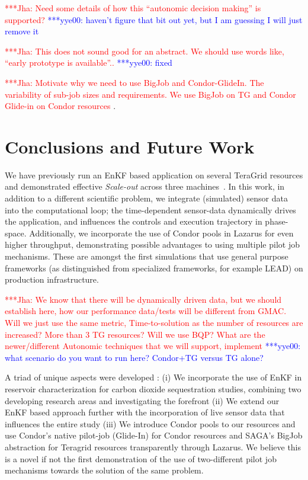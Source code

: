 \documentclass[10pt,conference,final]{IEEEtran}
\newcommand{\jhanote}[1]{ {\textcolor{red} { ***Jha: #1 }}}
\newcommand{\yyenote}[1]{ {\textcolor{blue} { ***yye00: #1 }}}
\newcommand{\jhanote}[1]{}
\newcommand{\yyenote}[1]{}
\begin{document}
\jhanote{Need some details of how this ``autonomic decision making'' is supported?}
\yyenote{haven't figure that bit out yet, but I am guessing I will just remove it}

\jhanote{This does not sound good for an abstract. We should use words like, ``early 
prototype is available''..}
\yyenote{fixed}

\jhanote{Motivate why we need to use BigJob and Condor-GlideIn. The variability of
sub-job sizes and requirements. We use BigJob on TG and Condor Glide-in on Condor
resources}.

\section*{Conclusions and Future Work}

We have previously run an EnKF based application on several 
TeraGrid resources and demonstrated effective {\it Scale-out} across three 
machines~\cite{gmac}. In this work, in addition to a different scientific problem, we 
integrate (simulated) sensor data into the computational loop; the time-dependent 
sensor-data dynamically drives the application, and influences the controls and execution 
trajectory in phase-space. Additionally, we incorporate the use of Condor pools
in Lazarus for even higher throughput, demonstrating possible advantages to
using multiple pilot job mechanisms. These are amongst the first simulations that use general 
purpose frameworks (as distinguished from specialized frameworks, for example LEAD) on 
production infrastructure.

\jhanote{We know that there will be dynamically driven data, but we should 
establish here, how our performance data/tests will be different from GMAC.  Will we just 
use the same metric, Time-to-solution as the number of resources are increased? More than 
3 TG resources? Will we use BQP? What are the newer/different Autonomic techniques that we 
will support, implement} \yyenote{what scenario do you want to run here? Condor+TG versus 
TG alone?}

A triad of unique aspects were developed : (i) We
incorporate the use of EnKF in reservoir characterization for carbon dioxide sequestration
studies, combining two developing research areas and investigating the forefront (ii) We 
extend our EnKF based approach further with the incorporation of live sensor data that 
influences the entire study (iii) We introduce Condor pools to our resources and use 
Condor's native pilot-job (Glide-In) for Condor resources and SAGA's BigJob abstraction 
for Teragrid resources transparently through Lazarus. We believe this is a novel if not 
the first demonstration of the use of two-different pilot job mechanisms towards the 
solution of the same problem.


 

\end{document}
